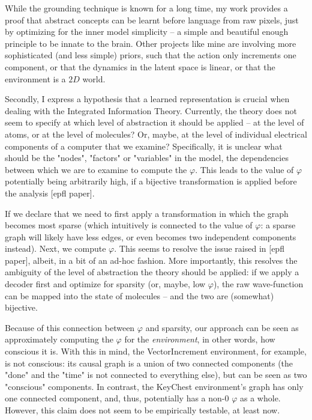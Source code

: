 \documentclass[a4paper,11pt,oneside]{report}
\begin{document}
While the grounding technique is known for a long time, my work provides a proof that abstract concepts can be learnt before language from raw pixels, just by optimizing for the inner model simplicity -- a simple and beautiful enough principle to be innate to the brain. Other projects like mine are involving more sophisticated (and less simple) priors, such that the action only increments one component, or that the dynamics in the latent space is linear, or that the environment is a $2D$ world.

Secondly, I express a hypothesis that a learned representation is crucial when dealing with the Integrated Information Theory. Currently, the theory does not seem to specify at which level of abstraction it should be applied -- at the level of atoms, or at the level of molecules? Or, maybe, at the level of individual electrical components of a computer that we examine? Specifically, it is unclear what should be the "nodes", "factors" or "variables" in the model, the dependencies between which we are to examine to compute the $\varphi$. This leads to the value of $\varphi$ potentially being arbitrarily high, if a bijective transformation is applied before the analysis [epfl paper].

If we declare that we need to first apply a transformation in which the graph becomes most sparse (which intuitively is connected to the value of $\varphi$: a sparse graph will likely have less edges, or even becomes two independent components instead). Next, we compute $\varphi$. This seems to resolve the issue raised in [epfl paper], albeit, in a bit of an ad-hoc fashion. More importantly, this resolves the ambiguity of the level of abstraction the theory should be applied: if we apply a decoder first and optimize for sparsity (or, maybe, low $\varphi$), the raw wave-function can be mapped into the state of molecules -- and the two are (somewhat) bijective.

Because of this connection between $\varphi$ and sparsity, our approach can be seen as approximately computing the $\varphi$ for the {\em environment}, in other words, how conscious it is. With this in mind, the VectorIncrement environment, for example, is not conscious: its causal graph is a union of two connected components (the "done" and the "time" is not connected to everything else), but can be seen as two "conscious" components. In contrast, the KeyChest environment's graph has only one connected component, and, thus, potentially has a non-$0$ $\varphi$ as a whole. However, this claim does not seem to be empirically testable, at least now.
\end{document}
